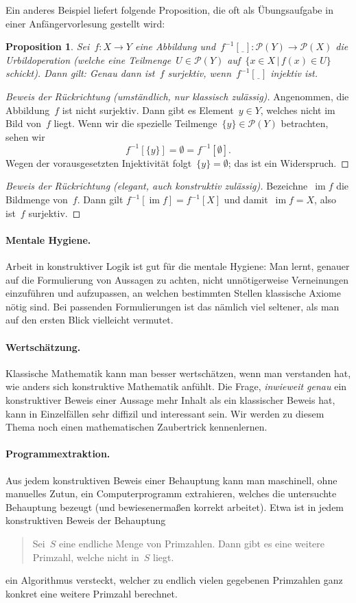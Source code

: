 \documentclass[a4paper,ngerman,12pt]{scrartcl}
\theoremstyle{definition}
\theoremstyle{plain}
\newtheorem{prop}[defn]{Proposition}
\theoremstyle{remark}
\renewcommand{\P}{\mathcal{P}}
\newcommand{\freist}{\underline{\ \ }}
\DeclareMathOperator{\im}{im}
\renewcommand{\_}{\mathpunct{.}\,}
\newcommand{\?}{\,{:}\,}
\begin{document}
Ein anderes Beispiel liefert folgende Proposition, die oft als Übungsaufgabe in
einer Anfängervorlesung gestellt wird:
\begin{prop}Sei~$f : X \to Y$ eine Abbildung und~$f^{-1}[\freist] : \P(Y) \to
\P(X)$ die Urbildoperation (welche eine Teilmenge~$U \in \P(Y)$ auf~$\{ x \in X
\,|\, f(x) \in U \}$ schickt). Dann gilt: Genau dann ist~$f$ surjektiv,
wenn~$f^{-1}[\freist]$ injektiv ist.
\end{prop}
\begin{proof}[Beweis der Rückrichtung (umständlich, nur klassisch zulässig)]
Angenommen, die Abbildung~$f$ ist nicht surjektiv. Dann gibt es Element~$y \in
Y$, welches nicht im Bild von~$f$ liegt. Wenn wir die spezielle
Teilmenge~$\{y\} \in \P(Y)$ betrachten, sehen wir
\[ f^{-1}[\{y\}] = \emptyset = f^{-1}[\emptyset]. \]
Wegen der vorausgesetzten Injektivität folgt~$\{y\} = \emptyset$; das ist ein
Widerspruch.\end{proof}
\begin{proof}[Beweis der Rückrichtung (elegant, auch konstruktiv zulässig)]
Bezeichne~$\im f$ die Bildmenge von~$f$. Dann gilt
$f^{-1}[\im f] = f^{-1}[X]$
und damit~$\im f = X$, also ist~$f$ surjektiv.\end{proof}

\paragraph{Mentale Hygiene.} Arbeit in konstruktiver Logik ist gut für die
mentale Hygiene: Man lernt, genauer auf die Formulierung von Aussagen zu
achten, nicht unnötigerweise Verneinungen einzuführen und aufzupassen, an
welchen bestimmten Stellen klassische Axiome nötig sind. Bei passenden
Formulierungen ist das nämlich viel seltener, als man auf den ersten Blick
vielleicht vermutet.

\paragraph{Wertschätzung.} Klassische Mathematik kann man besser wertschätzen,
wenn man verstanden hat, wie anders sich konstruktive Mathematik anfühlt.
Die Frage, \emph{inwieweit genau} ein konstruktiver Beweis einer Aussage mehr
Inhalt als ein klassischer Beweis hat, kann in Einzelfällen sehr diffizil und
interessant sein. Wir werden zu diesem Thema noch einen mathematischen
Zaubertrick kennenlernen.

\paragraph{Programmextraktion.} Aus jedem konstruktiven Beweis einer Behauptung
kann man maschinell, ohne manuelles Zutun, ein Computerprogramm extrahieren,
welches die untersuchte Behauptung bezeugt (und bewiesenermaßen korrekt
arbeitet). Etwa ist in jedem konstruktiven Beweis der Behauptung
\begin{quote}Sei~$S$ eine endliche Menge von Primzahlen. Dann gibt es eine
weitere Primzahl, welche nicht in~$S$ liegt.\end{quote}
ein Algorithmus versteckt, welcher zu endlich vielen gegebenen Primzahlen
ganz konkret eine weitere Primzahl berechnet.
\end{document}
